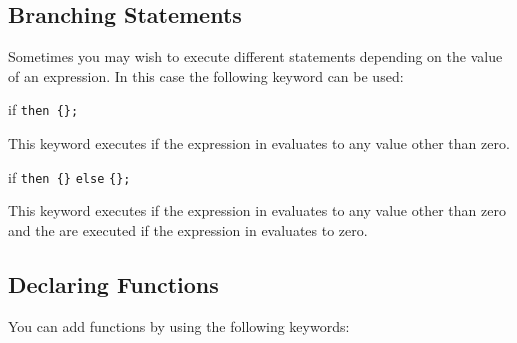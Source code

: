   
  


\subsection{Branching Statements}

  Sometimes you may wish to execute different statements
  depending on the value of an expression. In this
  case the following keyword can be used:

\begin{math-keyword}{{if}  \texttt{then \{}\texttt{\};}}

  This keyword executes  if the expression in 
  evaluates to any value other than zero.

\end{math-keyword}

\begin{math-keyword}{{if}  \texttt{then \{}\texttt{\}} \texttt{else} \texttt{\{}\texttt{\}}\texttt{;}}

  This keyword executes  if the expression in 
  evaluates to any value other than zero and the  are executed if
  the expression in  evaluates to zero.

\begin{codeexample}[]
\end{codeexample}
\end{math-keyword}

\subsection{Declaring Functions}

  You can add functions by using the following keywords:

